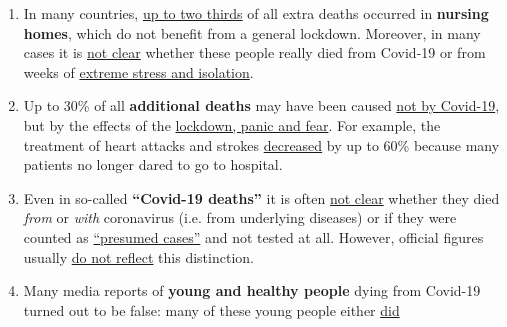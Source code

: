 \begin{enumerate}
{  about 4\%} of the deceased had no serious preconditions. The age and
  risk profile of deaths thus essentially corresponds to
  \href{https://www.vienna.at/analyse-zeigt-covid-19-opferkurve-entspricht-normaler-mortalitaet/6581246}{normal
  mortality}.
\item
  In many countries,
  \href{https://swprs.org/studies-on-covid-19-lethality/\#care-homes}{up
  to two thirds} of all extra deaths occurred in \textbf{nursing homes},
  which do not benefit from a general lockdown. Moreover, in many cases
  it is
  \href{https://www.hsj.co.uk/commissioning/thousands-of-extra-deaths-outside-hospital-not-attributed-to-covid-19/7027459.article}{not
  clear} whether these people really died from Covid-19 or from weeks of
  \href{https://www.theguardian.com/world/2020/jun/05/covid-19-causing-10000-dementia-deaths-beyond-infections-research-says}{extreme
  stress and isolation}.
\item
  Up to 30\% of all \textbf{additional deaths} may have been caused
  \href{https://www.ons.gov.uk/peoplepopulationandcommunity/birthsdeathsandmarriages/deaths/articles/analysisofdeathregistrationsnotinvolvingcoronaviruscovid19englandandwales28december2019to1may2020/technicalannex}{not
  by Covid-19}, but by the effects of the
  \href{https://www.telegraph.co.uk/global-health/science-and-disease/two-new-waves-deaths-break-nhs-new-analysis-warns/}{lockdown,
  panic and fear}. For example, the treatment of heart attacks and
  strokes
  \href{https://www.nytimes.com/2020/04/06/well/live/coronavirus-doctors-hospitals-emergency-care-heart-attack-stroke.html}{decreased}
  by up to 60\% because many patients no longer dared to go to hospital.
\item
  Even in so-called \textbf{``Covid-19 deaths''} it is often
  \href{https://spectator.us/understand-report-figures-covid-deaths/}{not
  clear} whether they died \emph{from} or \emph{with} coronavirus (i.e.
  from underlying diseases) or if they were counted as
  \href{https://www.youtube.com/watch?v=V0lIWZpiRU0}{``presumed cases''}
  and not tested at all. However, official figures usually
  \href{https://www.hsj.co.uk/coronavirus/systematic-reviews-to-discover-true-cause-of-outbreak-deaths/7027491.article}{do
  not reflect} this distinction.
\item
  Many media reports of \textbf{young and healthy people} dying from
  Covid-19 turned out to be false: many of these young people either
  \href{https://www.dailymail.co.uk/news/article-8193487/Coroner-refuses-rule-COVID-19-cause-death-six-week-old-Connecticut-baby.html}{did
}
\end{enumerate}
